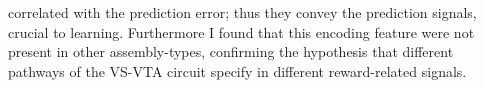 correlated with the prediction error; thus they convey the prediction signals, crucial to learning. Furthermore I found that this encoding feature were not present in other assembly-types, confirming the hypothesis that different pathways of the VS-VTA circuit specify in different reward-related signals.